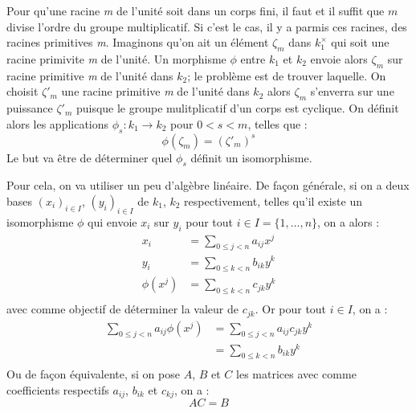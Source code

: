 \documentclass[a4paper]{article} %
\numberwithin{section}{part}
\numberwithin{equation}{section}
\newcommand\nroot[1]{\textit{#1}\up{\textit{ième}}}
\begin{document}
\vspace{0.3cm}

Pour qu'une racine \nroot{m} de l'unité soit dans un corps fini, il faut et il 
suffit que $m$ divise l'ordre du groupe multiplicatif. Si c'est le cas, il y a
parmis ces racines, des racines primitives \nroot{m}. Imaginons qu'on ait un 
élément $\zeta_m$ dans $k_1^{\times}$ qui soit une racine primivite \nroot{m} de
l'unité. Un morphisme $\phi$ entre $k_1$ et $k_2$ envoie alors 
$\zeta_m$ sur racine primitive \nroot{m} de l'unité dans $k_2$; le problème est
de trouver laquelle. On choisit $\zeta'_m$ une racine primitive \nroot{m} de 
l'unité dans $k_2$ alors $\zeta_m$ s'enverra sur une puissance $\zeta'_m$
puisque le groupe mulitplicatif d'un corps est cyclique. On définit alors les 
applications $\phi_s : k_1 \to k_2$ pour $0 < s < m$, telles que :
\[\phi(\zeta_m) = (\zeta'_m)^s\]
Le but va être de déterminer quel $\phi_s$ définit un isomorphisme.\par
Pour cela, on va utiliser un peu d'algèbre linéaire. De façon générale, si on a
deux bases $(x_i)_{i\in I}$, $(y_i)_{i\in I}$ de $k_1$, $k_2$ respectivement,
telles qu'il existe un isomorphisme $\phi$ qui envoie $x_i$ sur $y_i$ pour tout
$i\in I = \lbrace{1,\dots,n}\rbrace$, on a alors :
\begin{align*}
x_i &= \sum_{0\leq j < n}{a_{ij}x^j}\\
y_i &= \sum_{0\leq k < n}{b_{ik}y^k}\\
\phi(x^j) &= \sum_{0\leq k < n}{c_{jk}y^k}\\
\end{align*}
avec comme objectif de déterminer la valeur de $c_{jk}$. Or pour tout $i\in I$, 
on a : 
\begin{align*}
\sum_{0\leq j < n}{a_{ij}\phi{(x^j)}}&= \sum_{0\leq j < n}{a_{ij}c_{jk}y^k}\\
&= \sum_{0\leq k < n}{b_{ik}y^k}\\
\end{align*}
Ou de façon équivalente, si on pose $A$, $B$ et $C$ les matrices avec comme 
coefficients respectifs $a_{ij}$, $b_{ik}$ et $c_{kj}$, on a :
\[AC = B\]\par
\end{document}
